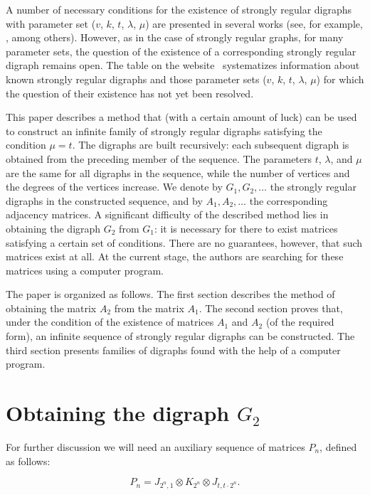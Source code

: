 \documentclass{article}
\begin{document}
A number of necessary conditions for the existence of strongly regular digraphs with parameter set ($v$, $k$, $t$, $\lambda$, $\mu$) are presented in several works (see, for example, \cite{bibDuval1, bibJorgensen1}, among others). However, as in the case of strongly regular graphs, for many parameter sets, the question of the existence of a corresponding strongly regular digraph remains open. The table on the website~\cite{bibBrouwer1} systematizes information about known strongly regular digraphs and those parameter sets ($v$, $k$, $t$, $\lambda$, $\mu$) for which the question of their existence has not yet been resolved.

This paper describes a method that (with a certain amount of luck) can be used to construct an infinite family of strongly regular digraphs satisfying the condition $\mu = t$. The digraphs are built recursively: each subsequent digraph is obtained from the preceding member of the sequence. The parameters $t$, $\lambda$, and $\mu$ are the same for all digraphs in the sequence, while the number of vertices and the degrees of the vertices increase. We denote by $G_1, G_2, \ldots$ the strongly regular digraphs in the constructed sequence, and by $A_1, A_2, \ldots$ the corresponding adjacency matrices. A significant difficulty of the described method lies in obtaining the digraph $G_2$ from $G_1$: it is necessary for there to exist matrices satisfying a certain set of conditions. There are no guarantees, however, that such matrices exist at all. At the current stage, the authors are searching for these matrices using a computer program.

The paper is organized as follows. The first section describes the method of obtaining the matrix $A_2$ from the matrix $A_1$. The second section proves that, under the condition of the existence of matrices $A_1$ and $A_2$ (of the required form), an infinite sequence of strongly regular digraphs can be constructed. The third section presents families of digraphs found with the help of a computer program.

\section{Obtaining the digraph $G_2$}
\label{sec1}

For further discussion we will need an auxiliary sequence of matrices $P_n$, defined as follows:

\begin{equation}
\label{eq:Pndef}
P_n = J_{2^n, 1} \otimes K_{2^n} \otimes J_{t, t\cdot 2^n}.
\end{equation}
\end{document}
